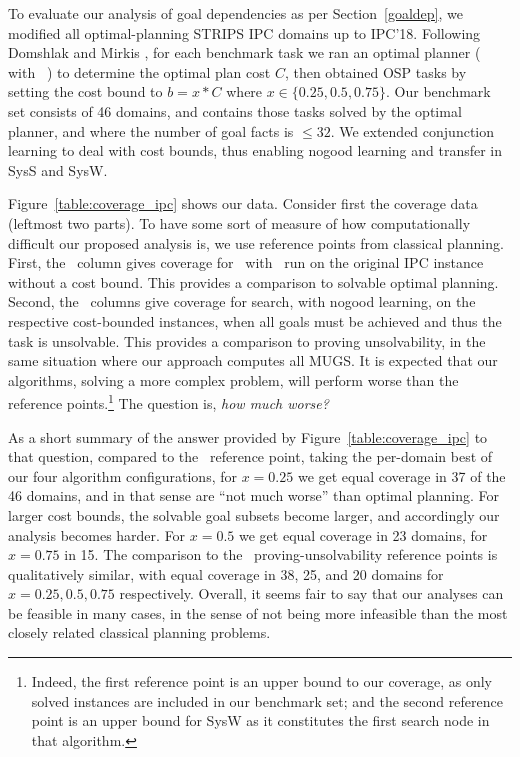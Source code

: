 To evaluate our analysis of goal dependencies as per
Section~\ref{goaldep}, we modified all optimal-planning STRIPS IPC
domains up to IPC'18. Following Domshlak and
Mirkis , for each benchmark task we
ran an optimal planner (\astar
with \hlmcut\ \cite{helmert:domshlak:icaps-09}) to determine the
optimal plan cost $C$, then obtained OSP tasks by setting the cost
bound to $b = x * C$ where $x \in \{0.25, 0.5, 0.75\}$. Our benchmark
set consists of 46 domains, and contains those tasks solved by the
optimal planner, and where the number of goal facts is $\leq 32$.
%
%
We extended conjunction learning \cite{steinmetz:hoffmann:ai-17} to
deal with cost bounds, thus enabling nogood learning and transfer in
SysS and SysW.

Figure~\ref{table:coverage_ipc} shows our data. Consider first the
coverage data (leftmost two parts). To have some sort of measure of
how computationally difficult our proposed analysis is, we use
reference points from classical planning. First, the \hlmcut\ column
gives coverage for \astar\ with \hlmcut\ run on the original IPC
instance without a cost bound. This provides a comparison to solvable
optimal planning. Second, the \hc\ columns give coverage for search,
with nogood learning, on the respective cost-bounded instances, when
all goals must be achieved and thus the task is unsolvable. This
provides a comparison to proving unsolvability, in the same situation
where our approach computes all MUGS.
%
It is expected that our algorithms, solving a more complex problem,
will perform worse than the reference points.\footnote{Indeed, the
first reference point is an upper bound to our coverage, as only
solved instances are included in our benchmark set; and the second
reference point is an upper bound for SysW as it constitutes the first
search node in that algorithm.} The question is, \emph{how much
worse?}

As a short summary of the answer provided by
Figure~\ref{table:coverage_ipc} to that question, compared to
the \hlmcut\ reference point, taking the per-domain best of our four
algorithm configurations, for $x=0.25$ we get equal coverage in 37 of
the 46 domains, and in that sense are ``not much worse'' than optimal
planning. For larger cost bounds, the solvable goal subsets become
larger, and accordingly our analysis becomes harder. For $x=0.5$ we
get equal coverage in 23 domains, for $x=0.75$ in 15. The comparison
to the \hc\ proving-unsolvability reference points is qualitatively
similar, with equal coverage in 38, 25, and 20 domains for $x=0.25,
0.5, 0.75$ respectively. Overall, it seems fair to say that our
analyses can be feasible in many cases, in the sense of not being more
infeasible than the most closely related classical planning problems.

